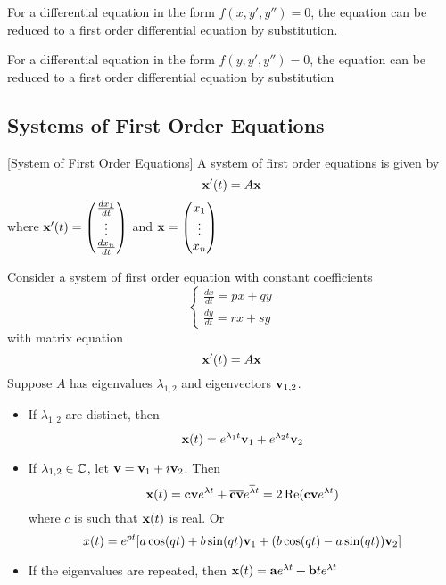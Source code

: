 \documentclass[a4paper]{article}
\begin{document}
\begin{prp}{}{} For a differential equation in the form $f(x,y',y'')=0$, the equation can be reduced to a first order differential equation by substitution. 
\end{prp}

\begin{prp}{}{} For a differential equation in the form $f(y,y',y'')=0$, the equation can be reduced to a first order differential equation by substitution
\end{prp}

\subsection{Systems of First Order Equations}
\begin{defn}{}{}[System of First Order Equations] A system of first order equations is given by $$\vb{x}'(t)=A\vb{x}$$ where $\vb{x}'(t)=\begin{pmatrix}\frac{dx_1}{dt}\\\vdots\\\frac{dx_n}{dt}\end{pmatrix}$ and $\vb{x}=\begin{pmatrix}x_1\\\vdots\\x_n\end{pmatrix}$
\end{defn}

\begin{thm}{}{} Consider a system of first order equation with constant coefficients $$\begin{cases}\frac{dx}{dt}=px+qy\\\frac{dy}{dt}=rx+sy\end{cases}$$ with matrix equation $$\vb{x}'(t)=A\vb{x}$$ Suppose $A$ has eigenvalues $\lambda_{1,2}$ and eigenvectors $\vb{v}_{1,2}$. 
\begin{itemize}
\item If $\lambda_{1,2}$ are distinct, then $$\vb{x}(t)=e^{\lambda_1t}\vb{v}_1+e^{\lambda_2t}\vb{v}_2$$
\item If $\lambda_{1,2}\in\mathbb{C}$, let $\vb{v}=\vb{v}_1+i\vb{v}_2$. Then $$\vb{x}(t)=\vb{c}\vb{v}e^{\lambda t}+\overline{\vb{c}}\overline{\vb{v}}e^{\overline{\lambda}t}=2\Re(\vb{c}\vb{v}e^{\lambda t})$$ where $c$ is such that $\vb{x}(t)$ is real. Or $$x(t)=e^{pt}[a\cos(qt)+b\sin(qt)\vb{v}_1+(b\cos(qt)-a\sin(qt))\vb{v}_2]$$
\item If the eigenvalues are repeated, then $\vb{x}(t)=\vb{a}e^{\lambda t}+\vb{b}te^{\lambda t}$
\end{itemize}
\end{thm}
\end{document}
